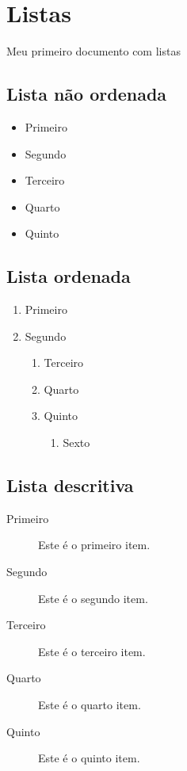 \documentclass{article}
\begin{document}
	\section{Listas}
	Meu primeiro documento com listas
	
	\subsection{Lista não ordenada}
	\begin{itemize}
		\item Primeiro
		\item Segundo
		\item Terceiro
		\item Quarto
		\item Quinto
	\end{itemize}

	\subsection{Lista ordenada}
	\begin{enumerate}
		\item Primeiro
		\item Segundo
		\begin{enumerate}
			\item Terceiro
			\item Quarto
			\item Quinto
			\begin{enumerate}
				\item Sexto
			\end{enumerate}
		\end{enumerate}
	\end{enumerate}

	\subsection{Lista descritiva}
	\begin{description}
		\item[Primeiro] Este é o primeiro item.
		\item[Segundo] Este é o segundo item.
		\item[Terceiro] Este é o terceiro item.
		\item[Quarto] Este é o quarto item.
		\item[Quinto] Este é o quinto item.
	\end{description}
\end{document}
